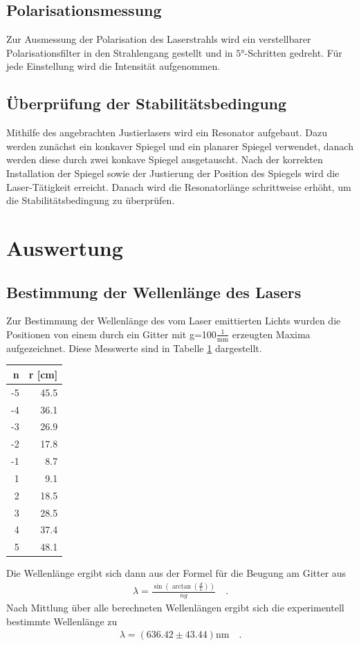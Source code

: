 \documentclass[captions=tableheading]{scrartcl}
\begin{document}
\subsection{Polarisationsmessung}
Zur Ausmessung der Polarisation des Laserstrahls wird ein verstellbarer Polarisationsfilter in den Strahlengang gestellt und in $\ang{5}$-Schritten gedreht. Für jede Einstellung wird die Intensität aufgenommen.

\subsection{Überprüfung der Stabilitätsbedingung}
Mithilfe des angebrachten Justierlasers wird ein Resonator aufgebaut. Dazu werden zunächst ein konkaver Spiegel und ein planarer Spiegel verwendet, danach werden diese durch zwei konkave Spiegel ausgetauscht. Nach der korrekten Installation der Spiegel sowie der Justierung der Position des Spiegels wird die Laser-Tätigkeit erreicht. Danach wird die Resonatorlänge schrittweise erhöht, um die Stabilitätsbedingung zu überprüfen.

\section{Auswertung}

\subsection{Bestimmung der Wellenlänge des Lasers}
Zur Bestimmung der Wellenlänge des vom Laser emittierten Lichts wurden die Positionen von einem durch ein Gitter mit g=100$\frac{1}{\si{\milli\metre}}$ erzeugten Maxima aufgezeichnet. Diese Messwerte sind in Tabelle \ref{tab:maxima} dargestellt. \\
\begin{table}[H]
	\centering
		\label{tab:maxima}
		\begin{tabular}{r r}
			\toprule
			n & r [cm] \\
			\midrule
			-5 & 45.5 \\
			-4 & 36.1 \\
			-3 & 26.9 \\
			-2 & 17.8 \\
			-1 & 8.7 \\
			1 & 9.1 \\
			2 & 18.5 \\
			3 & 28.5 \\
			4 & 37.4 \\
			5 & 48.1 \\
			\bottomrule
		\end{tabular}
\end{table}
Die Wellenlänge ergibt sich dann aus der Formel für die Beugung am Gitter aus
\begin{align}
\lambda = \frac{\sin\left(\arctan\left( \frac{d}{L}\right) \right) }{ng}\quad.
\end{align}
Nach Mittlung über alle berechneten Wellenlängen ergibt sich die experimentell bestimmte Wellenlänge zu
\begin{align*}
\lambda = (636.42 \pm 43.44)\si{\nano\metre}\quad.
\end{align*}
\end{document}
